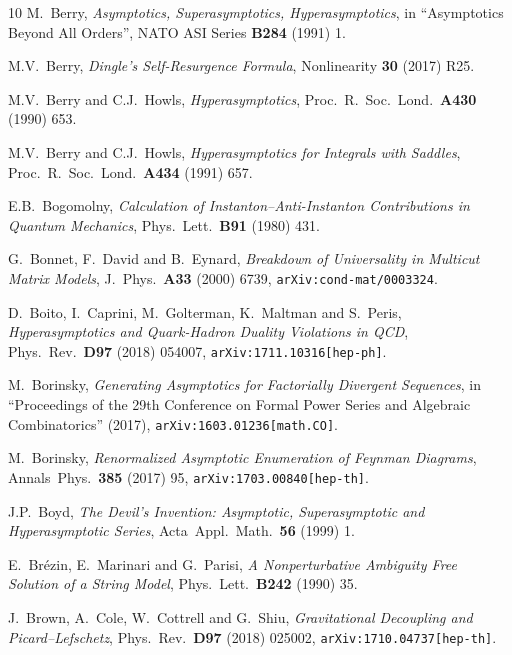 \documentclass[11pt,a4paper]{article}
\begin{document}
\begin{thebibliography}{10}
M.~Berry,
\textit{Asymptotics, Superasymptotics, Hyperasymptotics},
in ``Asymptotics Beyond All Orders'',
NATO ASI Series \textbf{B284} (1991) 1.

M.V.~Berry,
\textit{Dingle's Self-Resurgence Formula},
Nonlinearity \textbf{30} (2017) R25.

M.V.~Berry and C.J.~Howls,
\textit{Hyperasymptotics},
Proc.\ R.\ Soc.\ Lond.\ \textbf{A430} (1990) 653.

M.V.~Berry and C.J.~Howls,
\textit{Hyperasymptotics for Integrals with Saddles},
Proc.\ R.\ Soc.\ Lond.\ \textbf{A434} (1991) 657.

E.B.~Bogomolny,
\textit{Calculation of Instanton--Anti-Instanton Contributions in Quantum Mechanics},
Phys.\ Lett.\ \textbf{B91} (1980) 431.

G.~Bonnet, F.~David and B.~Eynard,
\textit{Breakdown of Universality in Multicut Matrix Models},
J.\ Phys.\ \textbf{A33} (2000) 6739,
\texttt{arXiv:cond-mat/0003324}.

D.~Boito, I.~Caprini, M.~Golterman, K.~Maltman and S.~Peris,
\textit{Hyperasymptotics and Quark-Hadron Duality Violations in QCD},
Phys.\ Rev.\ \textbf{D97} (2018) 054007,
\texttt{arXiv:1711.10316[hep-ph]}.

M.~Borinsky,
\textit{Generating Asymptotics for Factorially Divergent Sequences},
in ``Proceedings of the 29th Conference on Formal Power Series and Algebraic Combinatorics'' (2017),
\texttt{arXiv:1603.01236[math.CO]}.

M.~Borinsky,
\textit{Renormalized Asymptotic Enumeration of Feynman Diagrams},
Annals\ Phys.\ \textbf{385} (2017) 95,
\texttt{arXiv:1703.00840[hep-th]}.

J.P.~Boyd,
\textit{The Devil's Invention: Asymptotic, Superasymptotic and Hyperasymptotic Series},
Acta\ Appl.\ Math.\ \textbf{56} (1999) 1.

E.~Br\'ezin, E.~Marinari and G.~Parisi,
\textit{A Nonperturbative Ambiguity Free Solution of a String Model},
Phys.\ Lett.\ \textbf{B242} (1990) 35.

J.~Brown, A.~Cole, W.~Cottrell and G.~Shiu,
\textit{Gravitational Decoupling and Picard--Lefschetz},
Phys.\ Rev.\ \textbf{D97} (2018) 025002,
\texttt{arXiv:1710.04737[hep-th]}.


\end{thebibliography}
\end{document}
